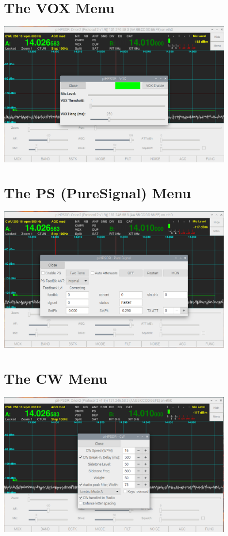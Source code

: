\documentclass[12pt]{book}
\begin{document}
\section{The VOX Menu}
\begin{center}
\includegraphics[width=12cm]{VOXMenu.png}
\end{center}

\section{The PS (PureSignal) Menu}
\begin{center}
\includegraphics[width=12cm]{PSMenu.png}
\end{center}

\section{The CW Menu}
\begin{center}
\includegraphics[width=12cm]{CWMenu.png}
\end{center}
\end{document}
